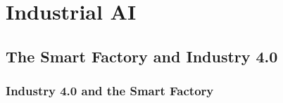 \chapter{Industrial AI}

\section{The Smart Factory and Industry 4.0}

\subsection{Industry 4.0 and the Smart Factory}

